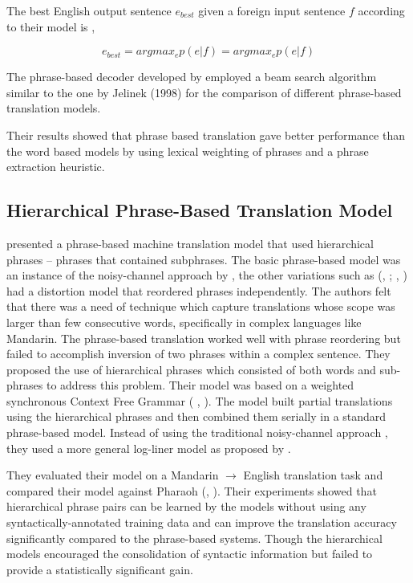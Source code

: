 The best English output sentence $e_{best}$ given a foreign input sentence $f$ according to their model is ,

$$
 e_{best}= argmax_ep(e|f)
         = argmax_ep(e|f)
$$

The phrase-based decoder developed by \cite{Koehn:2003:SPT:1073445.1073462} employed a beam search algorithm similar to the one by Jelinek (1998)  for the comparison of different phrase-based translation models.

Their results showed that phrase based translation gave better performance than the word based models by using lexical weighting of phrases and a phrase extraction heuristic.

\subsection{Hierarchical Phrase-Based Translation Model}

\cite{Chiang:2005:HPM:1219840.1219873} presented a  phrase-based machine translation model that used hierarchical phrases – phrases that contained subphrases. The basic phrase-based model was an instance of the noisy-channel approach by \cite{Brown:1993:MSM:972470.972474}, the other variations such as (\citeauthor{W99-0604}, \citeyear{W99-0604}; \citeauthor{Koehn:2003:SPT:1073445.1073462}, \citeyear{Koehn:2003:SPT:1073445.1073462}) had a distortion model that reordered phrases independently. The authors felt that there was a need of technique which capture translations whose scope was larger than few consecutive words, specifically in complex languages like Mandarin. The phrase-based translation worked well with phrase reordering but failed to accomplish inversion of two phrases within a complex sentence. They proposed the use of hierarchical phrases which consisted of both words and sub-phrases to address this problem. Their model was based on a weighted synchronous Context Free Grammar ( \citeauthor{Aho:1969:SDT:1739930.1740037}, \citeyear{Aho:1969:SDT:1739930.1740037}). The model built partial translations using the hierarchical phrases and then combined them serially in a standard phrase-based model.  Instead of using the traditional noisy-channel approach , they used a more general log-liner model as proposed by \cite{Och:2002:DTM:1073083.1073133}.

They evaluated their model on a Mandarin $\rightarrow$ English translation task and compared their model against Pharaoh (\citeauthor{10.1007/978-3-540-30194-3_13}, \citeyear{10.1007/978-3-540-30194-3_13}). Their experiments showed that hierarchical phrase pairs can be learned by the models without using any syntactically-annotated training data and can improve the translation accuracy significantly compared to the phrase-based systems. Though the hierarchical models encouraged the consolidation of syntactic information but failed to provide a statistically significant gain.


